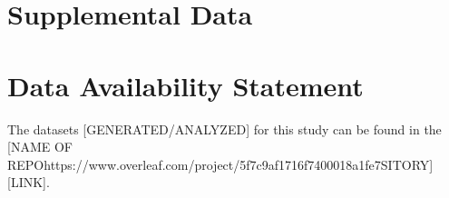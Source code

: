 \documentclass[utf8]{frontiersSCNS} %
\begin{document}
\section*{Supplemental Data}

\section*{Data Availability Statement}
The datasets [GENERATED/ANALYZED] for this study can be found in the [NAME OF REPOhttps://www.overleaf.com/project/5f7c9af1716f7400018a1fe7SITORY] [LINK].



\end{document}
